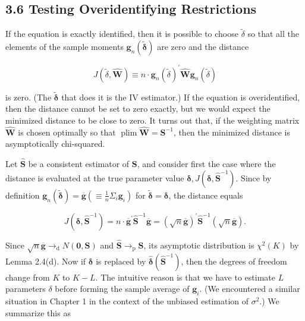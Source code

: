 \documentclass[10pt]{article}
\begin{document}
\subsection*{3.6 Testing Overidentifying Restrictions}
If the equation is exactly identified, then it is possible to choose $\tilde{\delta}$ so that all the elements of the sample moments $\mathbf{g}_{n}(\tilde{\boldsymbol{\delta}})$ are zero and the distance

$$
J(\tilde{\delta}, \widehat{\mathbf{W}}) \equiv n \cdot \mathbf{g}_{n}(\tilde{\delta})^{\prime} \widehat{\mathbf{W}} \mathbf{g}_{n}(\tilde{\delta})
$$

is zero. (The $\tilde{\boldsymbol{\delta}}$ that does it is the IV estimator.) If the equation is overidentified, then the distance cannot be set to zero exactly, but we would expect the minimized distance to be close to zero. It turns out that, if the weighting matrix $\widehat{\mathbf{W}}$ is chosen optimally so that $\operatorname{plim} \widehat{\mathbf{W}}=\mathbf{S}^{-1}$, then the minimized distance is asymptotically chi-squared.

Let $\widehat{\mathbf{S}}$ be a consistent estimator of $\mathbf{S}$, and consider first the case where the distance is evaluated at the true parameter value $\boldsymbol{\delta}, J\left(\boldsymbol{\delta}, \widehat{\mathbf{S}}^{-1}\right)$. Since by definition $\mathbf{g}_{n}(\tilde{\boldsymbol{\delta}})=\overline{\mathbf{g}}\left(\equiv \frac{1}{n} \Sigma_{i} \mathbf{g}_{i}\right)$ for $\tilde{\boldsymbol{\delta}}=\boldsymbol{\delta}$, the distance equals


\begin{equation*}
J\left(\boldsymbol{\delta}, \widehat{\mathbf{S}}^{-1}\right)=n \cdot \overline{\mathbf{g}}^{\prime} \widehat{\mathbf{S}}^{-1} \overline{\mathbf{g}}=(\sqrt{n} \overline{\mathbf{g}})^{\prime} \widehat{\mathbf{S}}^{-1}(\sqrt{n} \overline{\mathbf{g}}) . \tag{3.6.1}
\end{equation*}


Since $\sqrt{n} \overline{\mathbf{g}} \rightarrow_{\mathrm{d}} N(\mathbf{0}, \mathbf{S})$ and $\widehat{\mathbf{S}} \rightarrow_{\mathrm{p}} \mathbf{S}$, its asymptotic distribution is $\chi^{2}(K)$ by Lemma 2.4(d). Now if $\boldsymbol{\delta}$ is replaced by $\hat{\boldsymbol{\delta}}\left(\widehat{\mathbf{S}}^{-1}\right)$, then the degrees of freedom change from $K$ to $K-L$. The intuitive reason is that we have to estimate $L$ parameters $\delta$ before forming the sample average of $\mathbf{g}_{i}$. (We encountered a similar situation in Chapter 1 in the context of the unbiased estimation of $\sigma^{2}$.) We summarize this as
\end{document}

